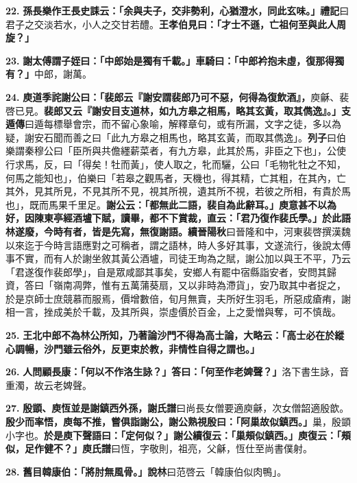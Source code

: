 \textbf{22.} \textbf{孫長樂作王長史誄云：「余與夫子，交非勢利，心猶澄水，同此玄味。」}{\footnotesize \textbf{禮記}曰君子之交淡若水，小人之交甘若醴。}\textbf{王孝伯見曰：「才士不遜，亡祖何至與此人周旋？」}

\textbf{23.} \textbf{謝太傅謂子姪曰：「中郎始是獨有千載。」車騎曰：「中郎衿抱未虛，復那得獨有？」}{\footnotesize 中郎，謝萬。}

\textbf{24.} \textbf{庾道季詫謝公曰：「裴郎云『謝安謂裴郎乃可不惡，何得為復飲酒』，}{\footnotesize 庾龢、裴啓已見。}\textbf{裴郎又云『謝安目支道林，如九方皋之相馬，略其玄黃，取其儁逸』。」}{\footnotesize \textbf{支遁傳}曰遁每標舉會宗，而不留心象喻，解釋章句，或有所漏，文字之徒，多以為疑，謝安石聞而善之曰「此九方皋之相馬也，略其玄黃，而取其儁逸」。\textbf{列子}曰伯樂謂秦穆公曰「臣所與共儋纆薪菜者，有九方皋，此其於馬，非臣之下也」，公使行求馬，反，曰「得矣！牡而黃」，使人取之，牝而驪，公曰「毛物牝牡之不知，何馬之能知也」，伯樂曰「若皋之觀馬者，天機也，得其精，亡其粗，在其內，亡其外，見其所見，不見其所不見，視其所視，遺其所不視，若彼之所相，有貴於馬也」，既而馬果千里足。}\textbf{謝公云：「都無此二語，裴自為此辭耳。」庾意甚不以為好，因陳東亭經酒壚下賦，讀畢，都不下賞裁，直云：「君乃復作裴氏學。」於此語林遂廢，今時有者，皆是先寫，無復謝語。}{\footnotesize \textbf{續晉陽秋}曰晉隆和中，河東裴啓撰漢魏以來迄于今時言語應對之可稱者，謂之語林，時人多好其事，文遂流行，後說太傅事不實，而有人於謝坐敘其黃公酒壚，司徒王珣為之賦，謝公加以與王不平，乃云「君遂復作裴郎學」，自是眾咸鄙其事矣，安鄉人有罷中宿縣詣安者，安問其歸資，答曰「嶺南凋弊，惟有五萬蒲葵扇，又以非時為滯貨」，安乃取其中者捉之，於是京師士庶競慕而服焉，價增數倍，旬月無賣，夫所好生羽毛，所惡成瘡痏，謝相一言，挫成美於千載，及其所與，崇虛價於百金，上之愛憎與奪，可不慎哉。}

\textbf{25.} \textbf{王北中郎不為林公所知，乃著論沙門不得為高士論，大略云：「高士必在於縱心調暢，沙門雖云俗外，反更束於教，非情性自得之謂也。」}

\textbf{26.} \textbf{人問顧長康：「何以不作洛生詠？」答曰：「何至作老婢聲？」}{\footnotesize 洛下書生詠，音重濁，故云老婢聲。}

\textbf{27.} \textbf{殷顗、庾恆並是謝鎮西外孫，}{\footnotesize \textbf{謝氏譜}曰尚長女僧要適庾龢，次女僧韶適殷歆。}\textbf{殷少而率悟，庾每不推，嘗俱詣謝公，謝公熟視殷曰：「阿巢故似鎮西。」}{\footnotesize 巢，殷顗小字也。}\textbf{於是庾下聲語曰：「定何似？」謝公續復云：「巢頰似鎮西。」庾復云：「頰似，足作健不？」}{\footnotesize \textbf{庾氏譜}曰恆，字敬則，祖亮，父龢，恆仕至尚書僕射。}

\textbf{28.} \textbf{舊目韓康伯：「將肘無風骨。」}{\footnotesize \textbf{說林}曰范啓云「韓康伯似肉鴨」。}


